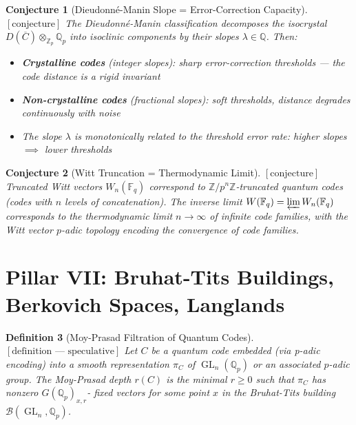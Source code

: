 \documentclass[12pt]{article}
\newtheorem{definition}{Definition}[section]
\newtheorem{conjecture}[definition]{Conjecture}
\theoremstyle{remark}
\begin{document}
\begin{conjecture}[Dieudonn\'e-Manin Slope = Error-Correction Capacity]
$[\text{conjecture}]$
The Dieudonn\'e-Manin classification decomposes the isocrystal
$D(\overline{C}) \otimes_{\mathbb{Z}_p} \mathbb{Q}_p$ into isoclinic
components by their slopes $\lambda \in \mathbb{Q}$. Then:
\begin{itemize}
\item \textbf{Crystalline codes} (integer slopes): sharp error-correction
  thresholds — the code distance is a rigid invariant
\item \textbf{Non-crystalline codes} (fractional slopes): soft thresholds,
  distance degrades continuously with noise
\item The slope $\lambda$ is monotonically related to the threshold error
  rate: higher slopes $\implies$ lower thresholds
\end{itemize}
\end{conjecture}

\begin{conjecture}[Witt Truncation = Thermodynamic Limit]
$[\text{conjecture}]$
Truncated Witt vectors $W_n(\mathbb{F}_q)$ correspond to
$\mathbb{Z}/p^n\mathbb{Z}$-truncated quantum codes (codes with $n$ levels
of concatenation). The inverse limit $W(\mathbb{F}_q) =
\varprojlim W_n(\mathbb{F}_q)$ corresponds to the thermodynamic limit
$n \to \infty$ of infinite code families, with the Witt vector
$p$-adic topology encoding the convergence of code families.
\end{conjecture}

\section{Pillar VII: Bruhat-Tits Buildings, Berkovich Spaces, Langlands}

\begin{definition}[Moy-Prasad Filtration of Quantum Codes]
$[\text{definition — speculative}]$
Let $C$ be a quantum code embedded (via p-adic encoding) into a smooth
representation $\pi_C$ of $\operatorname{GL}_n(\mathbb{Q}_p)$ or an
associated $p$-adic group. The \emph{Moy-Prasad depth} $r(C)$ is the
minimal $r \geq 0$ such that $\pi_C$ has nonzero $G(\mathbb{Q}_p)_{x,r}$-
fixed vectors for some point $x$ in the Bruhat-Tits building
$\mathcal{B}(\operatorname{GL}_n, \mathbb{Q}_p)$.
\end{definition}
\end{document}
